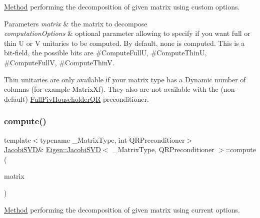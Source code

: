 \mbox{\hyperlink{struct_method}{Method}} performing the decomposition of given matrix using custom options. 


\begin{DoxyParams}{Parameters}
{\em matrix} & the matrix to decompose \\
\hline
{\em computation\+Options} & optional parameter allowing to specify if you want full or thin U or V unitaries to be computed. By default, none is computed. This is a bit-\/field, the possible bits are \#\+Compute\+FullU, \#\+Compute\+ThinU, \#\+Compute\+FullV, \#\+Compute\+ThinV.\\
\hline
\end{DoxyParams}
Thin unitaries are only available if your matrix type has a Dynamic number of columns (for example Matrix\+Xf). They also are not available with the (non-\/default) \mbox{\hyperlink{class_eigen_1_1_full_piv_householder_q_r}{Full\+Piv\+Householder\+QR}} preconditioner. \mbox{\label{class_eigen_1_1_jacobi_s_v_d_acc7b9a4068cf7b69ae3227d217ed7efd}} 
\subsubsection{\texorpdfstring{compute()}{compute()}\hspace{0.1cm}{\footnotesize\ttfamily [2/2]}}
{\footnotesize\ttfamily template$<$typename \+\_\+\+Matrix\+Type, int Q\+R\+Preconditioner$>$ \\
\mbox{\hyperlink{class_eigen_1_1_jacobi_s_v_d}{Jacobi\+S\+VD}}\& \mbox{\hyperlink{class_eigen_1_1_jacobi_s_v_d}{Eigen\+::\+Jacobi\+S\+VD}}$<$ \+\_\+\+Matrix\+Type, Q\+R\+Preconditioner $>$\+::compute (\begin{DoxyParamCaption}\item[{const Matrix\+Type \&}]{matrix }\end{DoxyParamCaption})\hspace{0.3cm}{\ttfamily [inline]}}



\mbox{\hyperlink{struct_method}{Method}} performing the decomposition of given matrix using current options. 


